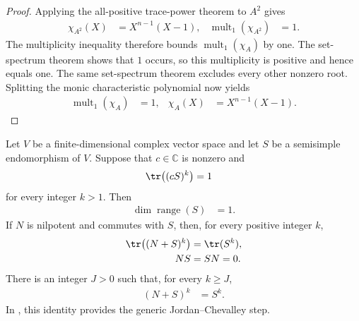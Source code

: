 \begin{proof}\leanok
    Applying the all-positive trace-power theorem to $A^2$ gives
    \begin{align}
        \chi_{A^2}(X) & =X^{n-1}(X-1),
                      & \operatorname{mult}_{1}(\chi_{A^2}) & =1.
    \end{align}
    The multiplicity inequality therefore bounds
    $\operatorname{mult}_{1}(\chi_A)$ by one. The set-spectrum theorem shows
    that $1$ occurs, so this multiplicity is positive and hence equals one.
    The same set-spectrum theorem excludes every other nonzero root. Splitting
    the monic characteristic polynomial now yields
    \begin{align}
        \operatorname{mult}_{1}(\chi_A) & =1,
                                        & \chi_A(X) & =X^{n-1}(X-1).
    \end{align}
\end{proof}

\begin{lemma}
    \label{thm:mpu_semisimple_scaled_trace_rank_one}
    \leanok
    Let $V$ be a finite-dimensional complex vector space and let $S$ be a
    semisimple endomorphism of $V$. Suppose that $c\in\mathbb C$ is nonzero and
    \begin{align}
        \tr\bigl((cS)^k\bigr) & =1
    \end{align}
    for every integer $k>1$. Then
    \begin{align}
        \dim\operatorname{range}(S) & =1.
    \end{align}
    If $N$ is nilpotent and commutes with $S$, then, for every positive integer
    $k$,
    \begin{align}
        \tr\bigl((N+S)^k\bigr) & =\tr(S^k), \\
        NS                     & =SN=0.
    \end{align}
    There is an integer $J>0$ such that, for every $k\geq J$,
    \begin{align}
        (N+S)^k & =S^k.
    \end{align}
    In \cite[Proposition~20, lines~3839--3866]{Molnar2018SemiInjective}, this identity provides the generic Jordan--Chevalley
    step.
\end{lemma}

